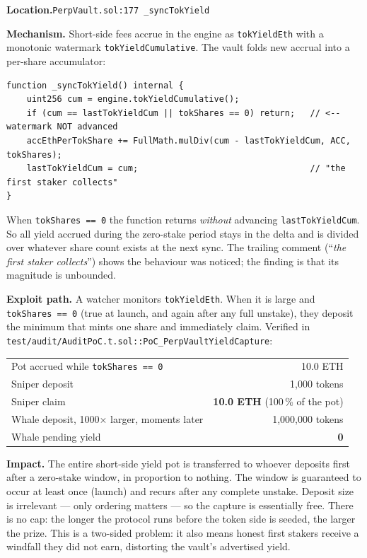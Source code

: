 \documentclass[10pt,a4paper]{article}
\newcommand{\loc}[1]{%
  \smallskip\noindent
  {\raggedright\textbf{Location.}\quad\texttt{\small #1}\par}\smallskip}
\newcommand{\code}[1]{\texttt{\small #1}}
\begin{document}
\loc{PerpVault.sol:177 \texttt{\_syncTokYield}}

\textbf{Mechanism.} Short-side fees accrue in the engine as
\code{tokYieldEth} with a monotonic watermark \code{tokYieldCumulative}. The
vault folds new accrual into a per-share accumulator:

\begin{lstlisting}[firstnumber=177]
function _syncTokYield() internal {
    uint256 cum = engine.tokYieldCumulative();
    if (cum == lastTokYieldCum || tokShares == 0) return;   // <-- watermark NOT advanced
    accEthPerTokShare += FullMath.mulDiv(cum - lastTokYieldCum, ACC, tokShares);
    lastTokYieldCum = cum;                                  // "the first staker collects"
}
\end{lstlisting}

\noindent When \code{tokShares == 0} the function returns \emph{without}
advancing \code{lastTokYieldCum}. So all yield accrued during the
zero-stake period stays in the delta and is divided over whatever share count
exists at the next sync. The trailing comment (``\emph{the first staker
collects}'') shows the behaviour was noticed; the finding is that its magnitude
is unbounded.

\textbf{Exploit path.} A watcher monitors \code{tokYieldEth}. When it is large
and \code{tokShares == 0} (true at launch, and again after any full
unstake), they deposit the minimum that mints one share and immediately claim.
Verified in \code{test/audit/AuditPoC.t.sol::PoC\_PerpVaultYieldCapture}:

\begin{center}\small
\begin{tabular}{@{}lr@{}}
\toprule
Pot accrued while \code{tokShares == 0} & 10.0 ETH \\
Sniper deposit & 1{,}000 tokens \\
Sniper claim & \textbf{10.0 ETH} (100\,\% of the pot) \\
Whale deposit, 1000$\times$ larger, moments later & 1{,}000{,}000 tokens \\
Whale pending yield & \textbf{0} \\
\bottomrule
\end{tabular}
\end{center}

\textbf{Impact.} The entire short-side yield pot is transferred to whoever
deposits first after a zero-stake window, in proportion to nothing. The window
is guaranteed to occur at least once (launch) and recurs after any complete
unstake. Deposit size is irrelevant --- only ordering matters --- so the capture
is essentially free. There is no cap: the longer the protocol runs before the
token side is seeded, the larger the prize. This is a two-sided problem: it also
means honest first stakers receive a windfall they did not earn, distorting the
vault's advertised yield.
\end{document}
